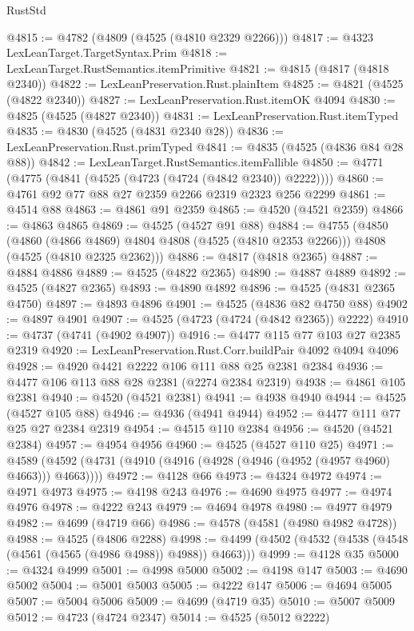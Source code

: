 \begin{lexlean}{RustStd}
\begin{coremodule}
@4815 := @4782 (@4809 (@4525 (@4810 @2329 @2266)))
@4817 := @4323 LexLeanTarget.TargetSyntax.Prim
@4818 := LexLeanTarget.RustSemantics.itemPrimitive
@4821 := @4815 (@4817 (@4818 @2340))
@4822 := LexLeanPreservation.Rust.plainItem
@4825 := @4821 (@4525 (@4822 @2340))
@4827 := LexLeanPreservation.Rust.itemOK @4094
@4830 := @4825 (@4525 (@4827 @2340))
@4831 := LexLeanPreservation.Rust.itemTyped
@4835 := @4830 (@4525 (@4831 @2340 @28))
@4836 := LexLeanPreservation.Rust.primTyped
@4841 := @4835 (@4525 (@4836 @84 @28 @88))
@4842 := LexLeanTarget.RustSemantics.itemFallible
@4850 := @4771 (@4775 (@4841 (@4525 (@4723 (@4724 (@4842 @2340)) @2222))))
@4860 := @4761 @92 @77 @88 @27 @2359 @2266 @2319 @2323 @256 @2299
@4861 := @4514 @88
@4863 := @4861 @91 @2359
@4865 := @4520 (@4521 @2359)
@4866 := @4863 @4865
@4869 := @4525 (@4527 @91 @88)
@4884 := @4755
    (@4850
      (@4860 (@4866 @4869) @4804 @4808 (@4525 (@4810 @2353 @2266)))
      @4808
      (@4525 (@4810 @2325 @2362)))
@4886 := @4817 (@4818 @2365)
@4887 := @4884 @4886
@4889 := @4525 (@4822 @2365)
@4890 := @4887 @4889
@4892 := @4525 (@4827 @2365)
@4893 := @4890 @4892
@4896 := @4525 (@4831 @2365 @4750)
@4897 := @4893 @4896
@4901 := @4525 (@4836 @82 @4750 @88)
@4902 := @4897 @4901
@4907 := @4525 (@4723 (@4724 (@4842 @2365)) @2222)
@4910 := @4737 (@4741 (@4902 @4907))
@4916 := @4477 @115 @77 @103 @27 @2385 @2319
@4920 := LexLeanPreservation.Rust.Corr.buildPair @4092 @4094 @4096
@4928 := @4920 @4421 @2222 @106 @111 @88 @25 @2381 @2384
@4936 := @4477 @106 @113 @88 @28 @2381 (@2274 @2384 @2319)
@4938 := @4861 @105 @2381
@4940 := @4520 (@4521 @2381)
@4941 := @4938 @4940
@4944 := @4525 (@4527 @105 @88)
@4946 := @4936 (@4941 @4944)
@4952 := @4477 @111 @77 @25 @27 @2384 @2319
@4954 := @4515 @110 @2384
@4956 := @4520 (@4521 @2384)
@4957 := @4954 @4956
@4960 := @4525 (@4527 @110 @25)
@4971 := @4589 (@4592 (@4731 (@4910 (@4916 (@4928 (@4946 (@4952 (@4957 @4960) @4663))) @4663))))
@4972 := @4128 @66
@4973 := @4324 @4972
@4974 := @4971 @4973
@4975 := @4198 @243
@4976 := @4690 @4975
@4977 := @4974 @4976
@4978 := @4222 @243
@4979 := @4694 @4978
@4980 := @4977 @4979
@4982 := @4699 (@4719 @66)
@4986 := @4578 (@4581 (@4980 @4982 @4728))
@4988 := @4525 (@4806 @2288)
@4998 := @4499 (@4502 (@4532 (@4538 (@4548 (@4561 (@4565 (@4986 @4988)) @4988)) @4663)))
@4999 := @4128 @35
@5000 := @4324 @4999
@5001 := @4998 @5000
@5002 := @4198 @147
@5003 := @4690 @5002
@5004 := @5001 @5003
@5005 := @4222 @147
@5006 := @4694 @5005
@5007 := @5004 @5006
@5009 := @4699 (@4719 @35)
@5010 := @5007 @5009
@5012 := @4723 (@4724 @2347)
@5014 := @4525 (@5012 @2222)

\end{coremodule}
\end{lexlean}
